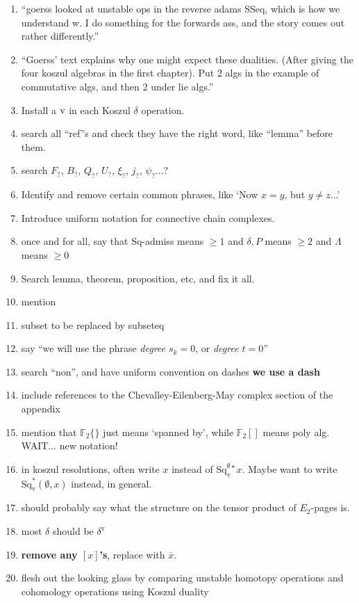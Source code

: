 \documentclass[11pt]{amsart} \renewcommand{\baselinestretch}{1.4}
\theoremstyle{plain}
\theoremstyle{definition}
\newcommand{\F}{\mathbb{F}}
\newcommand{\Ftwo}{\F_2}
\newcommand{\uver}{^\mathrm{v}}
\newcommand{\dver}{_\mathrm{v}}
\newcommand{\Sqv}{\mathrm{Sq}\dver}
\newcommand{\Sqvstar}[1]{\mathrm{Sq}\dver^{#1\star}}
\newcommand{\deltav}{\delta\uver}
\begin{document}
\begin{todolist}
\begin{enumerate}
\item ``goerss looked at unstable ops in the reverse adams SSeq, which is how we understand w. I do something for the forwards ass, and the story comes out rather differently.''
\item 
``Goerss' text explains why one might expect these dualities. (After giving the four koszul algebras in the first chapter). Put 2 algs in the example of commutative algs, and then 2 under lie algs.''
\item Install a $\textup{v}$ in each Koszul $\delta$ operation.
\item search all ``ref''s and check they have the right word, like ``lemma'' before them.
\item search $F_?$, $B_?$, $Q_?$, $U_?$, $\xi_?$, $j_?$, $\psi_?$...?
\item Identify and remove certain common phrases, like `Now $x=y$, but $y\neq z$...'
\item Introduce uniform notation for connective chain complexes.
\item once and for all, say that Sq-admiss means $\geq1$ and $\delta,P$ means $\geq2$ and $\Lambda$ means $\geq0$
\item Search lemma, theorem, proposition, etc, and fix it all.
\item mention %
\item subset to be replaced by subseteq
\item say ``we will use the phrase \emph{degree $s_k=0$}, or \emph{degree $t=0$}''
\item search ``non'', and have uniform convention on dashes \textbf{we use a dash}
\item include references to the Chevalley-Eilenberg-May complex section of the appendix
\item mention that $\Ftwo \{\}$ just means `spanned by', while $\Ftwo []$ means poly alg. WAIT... new notation!
\item in koszul resolutions, often write $x$ instead of $\Sqvstar{\emptyset}x$. Maybe want to write $\Sqv^*(\emptyset,x)$ instead, in general.
\item should probably say what the structure  on the tensor product of $E_2$-pages is.
\item most $\delta$ should be $\deltav$
\item  \textbf{remove any $[x]$'s}, replace with $\overline{x}$.
\item flesh out the looking glass by comparing unstable homotopy operations and cohomology operations using Koszul duality

\end{enumerate}
\end{todolist}
\end{document}
